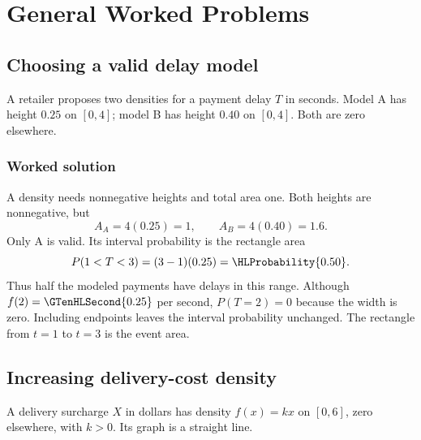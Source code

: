\section{General Worked Problems}\label{sec:general-worked}

\subsection{Choosing a valid delay model}\label{prob:sec:general-worked0}
A retailer proposes two densities for a payment delay $T$ in seconds. Model A has height $0.25$ on $[0,4]$; model B has height $0.40$ on $[0,4]$. Both are zero elsewhere.
\subsubsection*{Worked solution}\label{sol:sec:general-worked0}
A density needs nonnegative heights and total area one. Both heights are nonnegative, but
\[
A_A=4(0.25)=1,\qquad A_B=4(0.40)=1.6.
\]
Only A is valid. Its interval probability is the rectangle area
\[
P(1<T<3)=(3-1)(0.25)=\HLProbability{0.50}.
\]
Thus half the modeled payments have delays in this range. Although $f(2)=\GTenHLSecond{0.25}$ per second, $P(T=2)=0$ because the width is zero. Including endpoints leaves the interval probability unchanged.
The rectangle from $t=1$ to $t=3$ is the event area.


\subsection{Increasing delivery-cost density}\label{prob:sec:general-worked1}
A delivery surcharge $X$ in dollars has density $f(x)=kx$ on $[0,6]$, zero elsewhere, with $k>0$. Its graph is a straight line.
